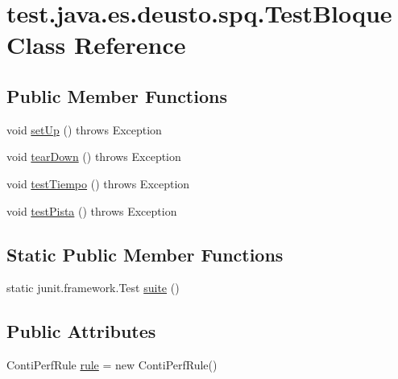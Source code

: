 \hypertarget{classtest_1_1java_1_1es_1_1deusto_1_1spq_1_1_test_bloque}{}\section{test.\+java.\+es.\+deusto.\+spq.\+Test\+Bloque Class Reference}
\label{classtest_1_1java_1_1es_1_1deusto_1_1spq_1_1_test_bloque}
\subsection*{Public Member Functions}
\begin{DoxyCompactItemize}
\item 
void \hyperlink{classtest_1_1java_1_1es_1_1deusto_1_1spq_1_1_test_bloque_ab4a0d5ee9f67ba2b6502b7caa1835ec8}{set\+Up} ()  throws Exception 
\item 
void \hyperlink{classtest_1_1java_1_1es_1_1deusto_1_1spq_1_1_test_bloque_a2ca5a729eb901bc6f77b4ed2bb895e29}{tear\+Down} ()  throws Exception 
\item 
void \hyperlink{classtest_1_1java_1_1es_1_1deusto_1_1spq_1_1_test_bloque_ae339dae2945cab51fbb0f7ef22d48ef4}{test\+Tiempo} ()  throws Exception 
\item 
void \hyperlink{classtest_1_1java_1_1es_1_1deusto_1_1spq_1_1_test_bloque_ac1f0fcd16a450f2c791de3d78e2df9c4}{test\+Pista} ()  throws Exception 
\end{DoxyCompactItemize}
\subsection*{Static Public Member Functions}
\begin{DoxyCompactItemize}
\item 
static junit.\+framework.\+Test \hyperlink{classtest_1_1java_1_1es_1_1deusto_1_1spq_1_1_test_bloque_a8b5a61035b6f549f4268f5f0fa145036}{suite} ()
\end{DoxyCompactItemize}
\subsection*{Public Attributes}
\begin{DoxyCompactItemize}
\item 
Conti\+Perf\+Rule \hyperlink{classtest_1_1java_1_1es_1_1deusto_1_1spq_1_1_test_bloque_a16e61375484212082690ea20320b4546}{rule} = new Conti\+Perf\+Rule()
\end{DoxyCompactItemize}


